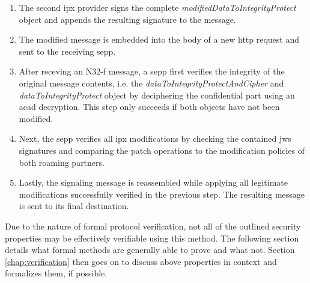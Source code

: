 \begin{enumerate}[wide, labelwidth=!, labelindent=0pt]
    \item The second \gls{ipx} provider signs the complete \textit{modifiedDataToIntegrityProtect} object and appends the resulting signature to the message.
    \item The modified message is embedded into the body of a new \gls{http} request and sent to the receiving \gls{sepp}.
    \item After receving an N32-f message, a \gls{sepp} first verifies the integrity of the original message contents, i.e. the \textit{dataToIntegrityProtectAndCipher} and \textit{dataToIntegrityProtect} object by deciphering the confidential part using an \gls{aead} decryption. This step only succeeds if both objects have not been modified.
    \item Next, the \gls{sepp} verifies all \gls{ipx} modifications by checking the contained \gls{jws} signatures and comparing the patch operations to the modification policies of both roaming partners.
    \item Lastly, the signaling message is reassembled while applying all legitimate modifications successfully verified in the previous step. The resulting message is sent to its final destination.
\end{enumerate}

Due to the nature of formal protocol verification, not all of the outlined security properties may be effectively verifiable using this method.
The following section details what formal methods are generally able to prove and what not.
Section \ref{chap:verification} then goes on to discuss above properties in context and formalizes them, if possible.